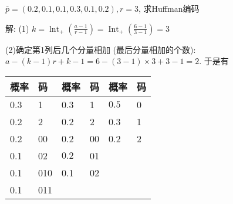 \begin{example}
  $ \bar{p}=(0.2,0.1,0.1,0.3,0.1,0.2), r=3 $, 求Huffman编码
    
    解: (1) $ k=\operatorname{lnt}_{+}\left(\frac{a-1}{r-1}\right)=\operatorname{Int}_{+}\left(\frac{6-1}{3-1}\right)=3 $
    
(2)确定第1列后几个分量相加 (最后分量相加的个数): $ a-(k-1) r+k-1=6-(3-1) \times 3+3-1=2 $. 于是有
\begin{center}
\begin{tabular}{ll||ll||ll} 
\hline
概率 & 码 & 概率 & 码 & 概率 & 码 \\
\hline
0.3 & 1 & 0.3 & 1 & $ \boxed{0.5} $ & 0 \\
0.2 & 2 & 0.2 & 2 & 0.3 & 1 \\
0.2 & 00 & 0.2 & 00 & 0.2 & 2 \\
0.1 & 02 & $ \boxed{0.2} $ & 01 & & \\
0.1 & 010 & 0.1 & 02 & & \\
0.1 & 011 & & & &\\
\hline
\end{tabular}
\end{center}

\end{example}












